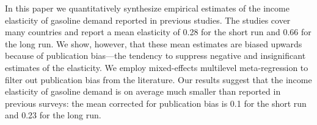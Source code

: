In this paper we quantitatively synthesize empirical estimates of the income elasticity of gasoline demand reported in previous studies. The studies cover many countries and report a mean elasticity of 0.28 for the short run and 0.66 for the long run. We show, however, that these mean estimates are biased upwards because of publication bias—the tendency to suppress negative and insignificant estimates of the elasticity. We employ mixed-effects multilevel meta-regression to filter out publication bias from the literature. Our results suggest that the income elasticity of gasoline demand is on average much smaller than reported in previous surveys: the mean corrected for publication bias is 0.1 for the short run and 0.23 for the long run.
